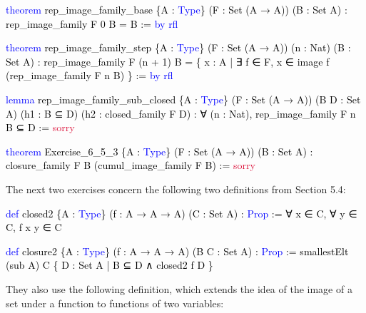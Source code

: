 \documentclass[
  letterpaper,
  DIV=11,
  numbers=noendperiod]{scrreprt}
\newenvironment{Shaded}{\begin{snugshade}}{\end{snugshade}}
\newcommand{\ConstantTok}[1]{\textcolor[rgb]{0.56,0.35,0.01}{#1}}
\newcommand{\KeywordTok}[1]{\textcolor[rgb]{0.00,0.23,0.31}{#1}}
\newcommand{\NormalTok}[1]{\textcolor[rgb]{0.00,0.23,0.31}{#1}}
\renewcommand{\NormalTok}[1]{\textcolor[HTML]{000000}{#1}}
\renewcommand{\KeywordTok}[1]{\textcolor[HTML]{0000FF}{#1}}
\renewcommand{\ConstantTok}[1]{\textcolor[HTML]{DC143C}{#1}}
\newenvironment{mdsk}
	{\medskip}
	{}
\theoremstyle{remark}
\begin{document}
\begin{Shaded}
\begin{Highlighting}[]
\KeywordTok{theorem}\NormalTok{ rep\_image\_family\_base \{A : }\KeywordTok{Type}\NormalTok{\}}
\NormalTok{    (F : Set (A → A)) (B : Set A) : rep\_image\_family F 0 B = B := }\KeywordTok{by} \KeywordTok{rfl}

\KeywordTok{theorem}\NormalTok{ rep\_image\_family\_step \{A : }\KeywordTok{Type}\NormalTok{\}}
\NormalTok{    (F : Set (A → A)) (n : Nat) (B : Set A) :}
\NormalTok{    rep\_image\_family F (n + 1) B =}
\NormalTok{    \{ x : A | ∃ f ∈ F, x ∈ image f (rep\_image\_family F n B) \} := }\KeywordTok{by} \KeywordTok{rfl}

\KeywordTok{lemma}\NormalTok{ rep\_image\_family\_sub\_closed \{A : }\KeywordTok{Type}\NormalTok{\}}
\NormalTok{    (F : Set (A → A)) (B D : Set A)}
\NormalTok{    (h1 : B ⊆ D) (h2 : closed\_family F D) :}
\NormalTok{    ∀ (n : Nat), rep\_image\_family F n B ⊆ D := }\ConstantTok{sorry}

\KeywordTok{theorem}\NormalTok{ Exercise\_6\_5\_3 \{A : }\KeywordTok{Type}\NormalTok{\} (F : Set (A → A)) (B : Set A) :}
\NormalTok{    closure\_family F B (cumul\_image\_family F B) := }\ConstantTok{sorry}
\end{Highlighting}
\end{Shaded}

\begin{mdsk}

\end{mdsk}

The next two exercises concern the following two definitions from
Section 5.4:

\begin{Shaded}
\begin{Highlighting}[]
\KeywordTok{def}\NormalTok{ closed2 \{A : }\KeywordTok{Type}\NormalTok{\} (f : A → A → A) (C : Set A) : }\KeywordTok{Prop}\NormalTok{ :=}
\NormalTok{  ∀ x ∈ C, ∀ y ∈ C, f x y ∈ C}

\KeywordTok{def}\NormalTok{ closure2 \{A : }\KeywordTok{Type}\NormalTok{\} (f : A → A → A) (B C : Set A) : }\KeywordTok{Prop}\NormalTok{ := }
\NormalTok{  smallestElt (sub A) C \{ D : Set A | B ⊆ D ∧ closed2 f D \}}
\end{Highlighting}
\end{Shaded}

They also use the following definition, which extends the idea of the
image of a set under a function to functions of two variables:
\end{document}
